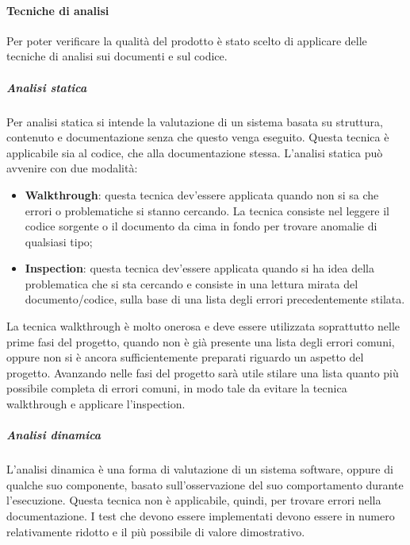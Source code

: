 \documentclass[../NormeProgetto.tex]{subfiles}
\begin{document}
	\paragraph{Tecniche di analisi}
	Per poter verificare la qualità del prodotto è stato scelto di applicare delle tecniche di analisi sui documenti e sul codice. 
		\subparagraph{Analisi statica} Per analisi statica si intende la valutazione di un sistema basata su struttura, contenuto e documentazione senza che questo venga eseguito. Questa tecnica è applicabile sia al codice, che alla documentazione stessa. L'analisi statica può avvenire con due modalità:
		\begin{itemize}
			\item \textbf{Walkthrough}: questa tecnica dev'essere applicata quando non si sa che errori o problematiche si stanno cercando. La tecnica consiste nel leggere il codice sorgente o il documento da cima in fondo per trovare anomalie  di qualsiasi tipo;
			\item \textbf{Inspection}: questa tecnica dev'essere applicata quando si ha idea della problematica che si sta cercando e consiste in una lettura mirata del documento/codice, sulla base di una lista degli errori precedentemente stilata.
		\end{itemize}
		La tecnica walkthrough è molto onerosa e deve essere utilizzata soprattutto nelle prime fasi del progetto, quando non è già presente una lista degli errori comuni, oppure non si è ancora sufficientemente preparati riguardo un aspetto del progetto. Avanzando nelle fasi del progetto sarà utile stilare una lista quanto più possibile completa di errori comuni, in modo tale da evitare la tecnica walkthrough e applicare l'inspection.
		
		\subparagraph{Analisi dinamica}
		L’analisi dinamica è una forma di valutazione di un sistema software, oppure di qualche suo componente, basato sull'osservazione del suo comportamento durante l'esecuzione. Questa tecnica non è applicabile, quindi, per trovare errori nella documentazione. I test che devono essere implementati devono essere in numero relativamente ridotto e il più possibile di valore dimostrativo.
		
\end{document}
